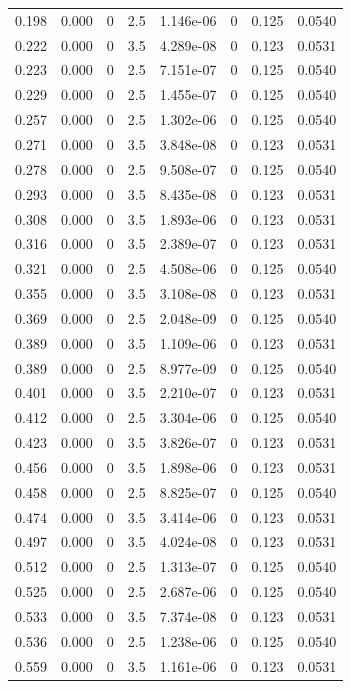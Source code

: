 \documentclass[preview]{standalone}
\begin{document}
{{\begin{tabular}{L{1.2cm}C{1.2cm} C{0.3cm}C{0.5cm} C{1.4cm}C{1.4cm} C{1.4cm}C{1.4cm}}
  0.198  &  0.000  & 0     & 2.5 &  1.146e-06  & 0  & 0.125 &  0.0540   \\ 
  0.222  &  0.000  & 0     & 3.5 &  4.289e-08  & 0  & 0.123 &  0.0531   \\ 
  0.223  &  0.000  & 0     & 2.5 &  7.151e-07  & 0  & 0.125 &  0.0540   \\ 
  0.229  &  0.000  & 0     & 2.5 &  1.455e-07  & 0  & 0.125 &  0.0540   \\ 
  0.257  &  0.000  & 0     & 2.5 &  1.302e-06  & 0  & 0.125 &  0.0540   \\ 
  0.271  &  0.000  & 0     & 3.5 &  3.848e-08  & 0  & 0.123 &  0.0531   \\ 
  0.278  &  0.000  & 0     & 2.5 &  9.508e-07  & 0  & 0.125 &  0.0540   \\ 
  0.293  &  0.000  & 0     & 3.5 &  8.435e-08  & 0  & 0.123 &  0.0531   \\ 
  0.308  &  0.000  & 0     & 3.5 &  1.893e-06  & 0  & 0.123 &  0.0531   \\ 
  0.316  &  0.000  & 0     & 3.5 &  2.389e-07  & 0  & 0.123 &  0.0531   \\ 
  0.321  &  0.000  & 0     & 2.5 &  4.508e-06  & 0  & 0.125 &  0.0540   \\ 
  0.355  &  0.000  & 0     & 3.5 &  3.108e-08  & 0  & 0.123 &  0.0531   \\ 
  0.369  &  0.000  & 0     & 2.5 &  2.048e-09  & 0  & 0.125 &  0.0540   \\ 
  0.389  &  0.000  & 0     & 3.5 &  1.109e-06  & 0  & 0.123 &  0.0531   \\ 
  0.389  &  0.000  & 0     & 2.5 &  8.977e-09  & 0  & 0.125 &  0.0540   \\ 
  0.401  &  0.000  & 0     & 3.5 &  2.210e-07  & 0  & 0.123 &  0.0531   \\ 
  0.412  &  0.000  & 0     & 2.5 &  3.304e-06  & 0  & 0.125 &  0.0540   \\ 
  0.423  &  0.000  & 0     & 3.5 &  3.826e-07  & 0  & 0.123 &  0.0531   \\ 
  0.456  &  0.000  & 0     & 3.5 &  1.898e-06  & 0  & 0.123 &  0.0531   \\ 
  0.458  &  0.000  & 0     & 2.5 &  8.825e-07  & 0  & 0.125 &  0.0540   \\ 
  0.474  &  0.000  & 0     & 3.5 &  3.414e-06  & 0  & 0.123 &  0.0531   \\ 
  0.497  &  0.000  & 0     & 3.5 &  4.024e-08  & 0  & 0.123 &  0.0531   \\ 
  0.512  &  0.000  & 0     & 2.5 &  1.313e-07  & 0  & 0.125 &  0.0540   \\ 
  0.525  &  0.000  & 0     & 2.5 &  2.687e-06  & 0  & 0.125 &  0.0540   \\ 
  0.533  &  0.000  & 0     & 3.5 &  7.374e-08  & 0  & 0.123 &  0.0531   \\ 
  0.536  &  0.000  & 0     & 2.5 &  1.238e-06  & 0  & 0.125 &  0.0540   \\ 
  0.559  &  0.000  & 0     & 3.5 &  1.161e-06  & 0  & 0.123 &  0.0531   \\ 
\hline 
\end{tabular} 

}}
\end{document}
